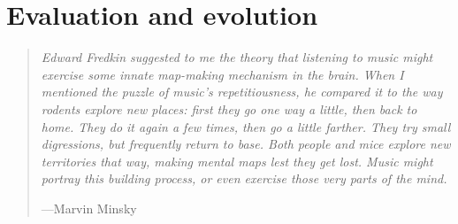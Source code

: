 \documentclass{article}
\begin{document}




\section{Evaluation and evolution}

\begin{samepage}
\begin{quotation}
\textsl{Edward Fredkin suggested to me the theory that listening to music might exercise some innate map-making mechanism in the brain. When I mentioned the puzzle of music's repetitiousness, he compared it to the way rodents explore new places: first they go one way a little, then back to home. They do it again a few times, then go a little farther. They try small digressions, but frequently return to base. Both people and mice explore new territories that way, making mental maps lest they get lost. Music might portray this building process, or even exercise those very parts of the mind.}

---Marvin Minsky \cite{Minsky1981}\end{quotation}
\end{samepage}
\end{document}
